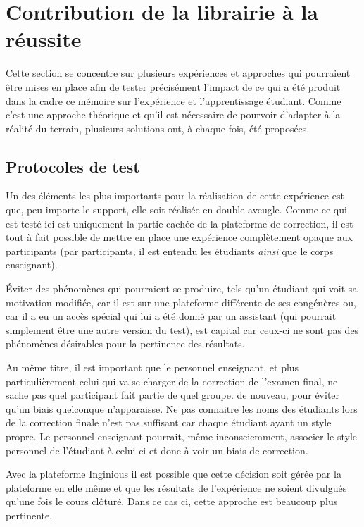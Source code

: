 \documentclass[a4paper]{report}
\begin{document}
\section{Contribution de la librairie à la réussite}
Cette section se concentre sur plusieurs expériences et approches qui pourraient être mises en place afin de tester précisément l'impact de ce qui a été produit dans la cadre ce mémoire sur l'expérience et l'apprentissage étudiant.
Comme c'est une approche théorique et qu'il est nécessaire de pourvoir d'adapter à la réalité du terrain, plusieurs solutions ont, à chaque fois, été proposées.


\subsection{Protocoles de test}

Un des éléments les plus importants pour la réalisation de cette expérience est que, peu importe le support, elle soit réalisée en double aveugle.
Comme ce qui est testé ici est uniquement la partie cachée de la plateforme de correction, il est tout à fait possible de mettre en place une expérience complètement opaque aux participants (par participants, il est entendu les étudiants \textit{ainsi} que le corps enseignant).

Éviter des phénomènes qui pourraient se produire, tels qu'un étudiant qui voit sa motivation modifiée, car il est sur une plateforme différente de ses congénères ou, car il a eu un accès spécial qui lui a été donné par un assistant (qui pourrait simplement être une autre version du test), est capital car ceux-ci ne sont pas des phénomènes désirables pour  la pertinence des résultats.

Au même titre, il est important que le personnel enseignant, et plus particulièrement celui qui va se charger de la correction de l'examen final, ne sache pas quel participant fait partie de quel groupe.
de nouveau, pour éviter qu'un biais quelconque n'apparaisse.
Ne pas connaitre les noms des étudiants lors de la correction finale n'est pas suffisant car chaque étudiant ayant un style propre.
Le personnel enseignant pourrait, même inconsciemment, associer le style personnel de l'étudiant à celui-ci et donc à voir un biais de correction.

Avec la plateforme Inginious il est possible que cette décision soit gérée par la plateforme en elle même et que les résultats de l'expérience ne soient divulgués qu'une fois le cours clôturé.
Dans ce cas ci, cette approche est beaucoup plus pertinente.
\end{document}
